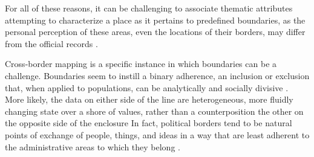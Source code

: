 For all of these reasons, it can be challenging to associate thematic attributes attempting to characterize a place as it pertains to predefined boundaries, as the personal perception of these areas, even the locations of their borders, may differ from the official records \cite{Acedo2019}. %

Cross-border mapping is a specific instance in which boundaries can be a challenge. Boundaries seem to instill a binary adherence, an inclusion or exclusion that, when applied to populations, can be analytically and socially divisive \cite{Acedo2019, MasseyD1991}. %
More likely, the data on either side of the line are heterogeneous, more fluidly changing state over a shore of values, rather than a counterposition the other on the opposite side of the enclosure %
In fact, political borders tend to be natural points of exchange of people, things, and ideas in a way that are least adherent to the administrative areas to which they belong \cite{Xing2015}.%

